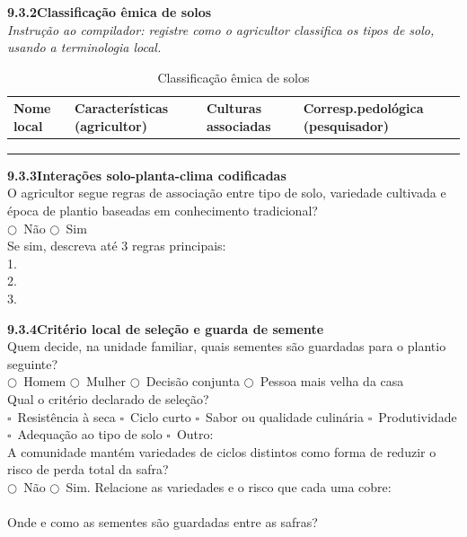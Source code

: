 \medskip\noindent\textbf{9.3.2\quad Classificação êmica de solos}\\[2pt]
\textit{Instrução ao compilador: registre como o agricultor classifica os tipos de solo, usando a terminologia local.}

\begin{table}[htbp]
\centering\small
\caption{Classificação êmica de solos}
\label{tab:app_solos_emico}
\begin{tabular}{p{2.5cm}p{3.0cm}p{3.0cm}p{3.5cm}}
\toprule
\textbf{Nome local} & \textbf{Características (agricultor)} & \textbf{Culturas associadas} & \textbf{Corresp.\@ pedológica (pesquisador)} \\
\midrule
& & & \\
& & & \\
& & & \\
\bottomrule
\end{tabular}
\end{table}

\medskip\noindent\textbf{9.3.3\quad Interações solo-planta-clima codificadas}\\[2pt]
O agricultor segue regras de associação entre tipo de solo, variedade cultivada e época de plantio baseadas em conhecimento tradicional?\\
$\bigcirc$~Não \quad $\bigcirc$~Sim\\[2pt]
Se sim, descreva até 3 regras principais:\\
1.\@ \dotfill\\
2.\@ \dotfill\\
3.\@ \dotfill

\medskip\noindent\textbf{9.3.4\quad Critério local de seleção e guarda de semente}\\[2pt]
Quem decide, na unidade familiar, quais sementes são guardadas para o plantio seguinte?\\
$\bigcirc$~Homem \quad $\bigcirc$~Mulher \quad $\bigcirc$~Decisão conjunta \quad $\bigcirc$~Pessoa mais velha da casa\\[2pt]
Qual o critério declarado de seleção?\\
$\square$~Resistência à seca \quad $\square$~Ciclo curto \quad $\square$~Sabor ou qualidade culinária \quad $\square$~Produtividade \quad $\square$~Adequação ao tipo de solo \quad $\square$~Outro: \dotfill\\[2pt]
A comunidade mantém variedades de ciclos distintos como forma de reduzir o risco de perda total da safra?\\
$\bigcirc$~Não \quad $\bigcirc$~Sim. Relacione as variedades e o risco que cada uma cobre: \dotfill\\[2pt]\dotfill\\[2pt]
Onde e como as sementes são guardadas entre as safras? \dotfill

